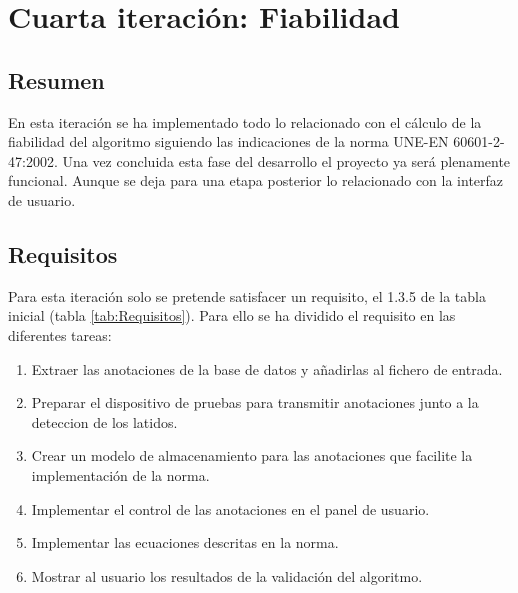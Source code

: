 
\section{Cuarta iteración: Fiabilidad}
    \subsection{Resumen}
        
        En esta iteración se ha implementado todo lo relacionado con el cálculo de la fiabilidad del algoritmo siguiendo las indicaciones de la norma UNE-EN 60601-2-47:2002. Una vez concluida esta fase del desarrollo el proyecto ya será plenamente funcional. Aunque se deja para una etapa posterior lo relacionado con la interfaz de usuario.
        
    \subsection{Requisitos}
    
        Para esta iteración solo se pretende satisfacer un requisito, el 1.3.5 de la tabla inicial (tabla \ref{tab:Requisitos}). Para ello se ha dividido el requisito en las diferentes tareas:
        
        \begin{enumerate}
            \item Extraer las anotaciones de la base de datos y añadirlas al fichero de entrada.
            \item Preparar el dispositivo de pruebas para transmitir anotaciones junto a la deteccion de los latidos.
            \item Crear un modelo de almacenamiento para las anotaciones que facilite la implementación de la norma. \cite{Aenor2002}
            \item Implementar el control de las anotaciones en el panel de usuario.
            \item Implementar las ecuaciones descritas en la norma. \cite{Aenor2002}
            \item Mostrar al usuario los resultados de la validación del algoritmo.
        \end{enumerate}
    
